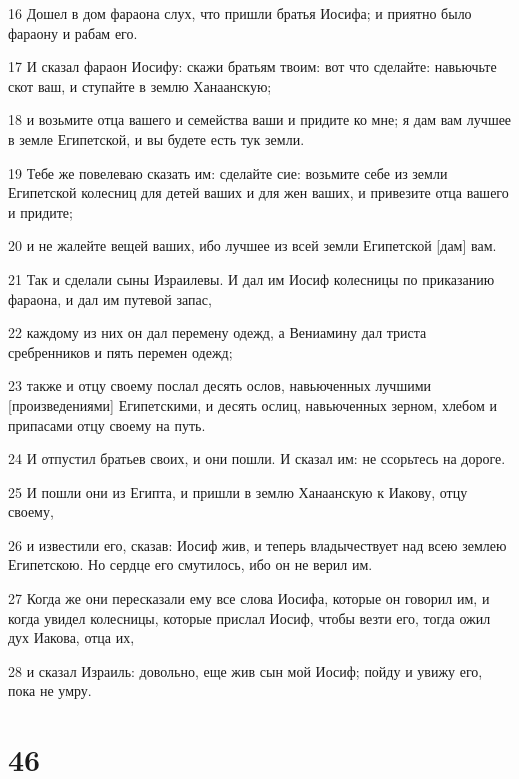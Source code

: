 \par 16 Дошел в дом фараона слух, что пришли братья Иосифа; и приятно было фараону и рабам его.
\par 17 И сказал фараон Иосифу: скажи братьям твоим: вот что сделайте: навьючьте скот ваш, и ступайте в землю Ханаанскую;
\par 18 и возьмите отца вашего и семейства ваши и придите ко мне; я дам вам лучшее в земле Египетской, и вы будете есть тук земли.
\par 19 Тебе же повелеваю сказать им: сделайте сие: возьмите себе из земли Египетской колесниц для детей ваших и для жен ваших, и привезите отца вашего и придите;
\par 20 и не жалейте вещей ваших, ибо лучшее из всей земли Египетской [дам] вам.
\par 21 Так и сделали сыны Израилевы. И дал им Иосиф колесницы по приказанию фараона, и дал им путевой запас,
\par 22 каждому из них он дал перемену одежд, а Вениамину дал триста сребренников и пять перемен одежд;
\par 23 также и отцу своему послал десять ослов, навьюченных лучшими [произведениями] Египетскими, и десять ослиц, навьюченных зерном, хлебом и припасами отцу своему на путь.
\par 24 И отпустил братьев своих, и они пошли. И сказал им: не ссорьтесь на дороге.
\par 25 И пошли они из Египта, и пришли в землю Ханаанскую к Иакову, отцу своему,
\par 26 и известили его, сказав: Иосиф жив, и теперь владычествует над всею землею Египетскою. Но сердце его смутилось, ибо он не верил им.
\par 27 Когда же они пересказали ему все слова Иосифа, которые он говорил им, и когда увидел колесницы, которые прислал Иосиф, чтобы везти его, тогда ожил дух Иакова, отца их,
\par 28 и сказал Израиль: довольно, еще жив сын мой Иосиф; пойду и увижу его, пока не умру.

\chapter{46}

